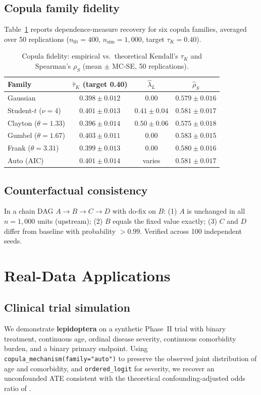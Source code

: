 \documentclass[12pt,a4paper]{article}
\newcommand{\pkg}[1]{\textbf{#1}}
\newcommand{\code}[1]{\texttt{#1}}
\begin{document}
\subsection{Copula family fidelity}
Table~\ref{tab:copula_sims} reports dependence-measure recovery for six copula families, averaged over 50 replications ($n_\text{fit}=400$, $n_\text{sim}=1{,}000$, target $\tau_K=0.40$).

\begin{table}[ht]
\centering
\caption{Copula fidelity: empirical vs.\ theoretical Kendall's $\tau_K$ and Spearman's $\rho_S$ (mean $\pm$ MC-SE, 50 replications).}
\label{tab:copula_sims}
\small
\begin{tabular}{lccc}
\toprule
Family & $\hat{\tau}_K$ (target 0.40) & $\hat{\lambda}_L$ & $\hat{\rho}_S$ \\
\midrule
Gaussian        & $0.398\pm0.012$ & $0.00$ & $0.579\pm0.016$ \\
Student-$t$ ($\nu=4$) & $0.401\pm0.013$ & $0.41\pm0.04$ & $0.581\pm0.017$ \\
Clayton ($\theta=1.33$) & $0.396\pm0.014$ & $0.50\pm0.06$ & $0.575\pm0.018$ \\
Gumbel ($\theta=1.67$) & $0.403\pm0.011$ & $0.00$ & $0.583\pm0.015$ \\
Frank ($\theta=3.31$)  & $0.399\pm0.013$ & $0.00$ & $0.580\pm0.016$ \\
Auto (AIC)      & $0.401\pm0.014$ & varies & $0.581\pm0.017$ \\
\bottomrule
\end{tabular}
\end{table}

\subsection{Counterfactual consistency}
In a chain DAG $A\to B\to C\to D$ with do-fix on $B$: (1) $A$ is unchanged in all $n=1{,}000$ units (upstream); (2) $B$ equals the fixed value exactly; (3) $C$ and $D$ differ from baseline with probability $>0.99$. Verified across 100 independent seeds.

\section{Real-Data Applications}
\label{sec:applications}

\subsection{Clinical trial simulation}
We demonstrate \pkg{lepidoptera} on a synthetic Phase~II trial \citep{morris2019using} with binary treatment, continuous age, ordinal disease severity, continuous comorbidity burden, and a binary primary endpoint. Using \code{copula\_mechanism(family="auto")} to preserve the observed joint distribution of age and comorbidity, and \code{ordered\_logit} for severity, we recover an unconfounded ATE consistent with the theoretical confounding-adjusted odds ratio of \citet{morris2019using}.
\end{document}
